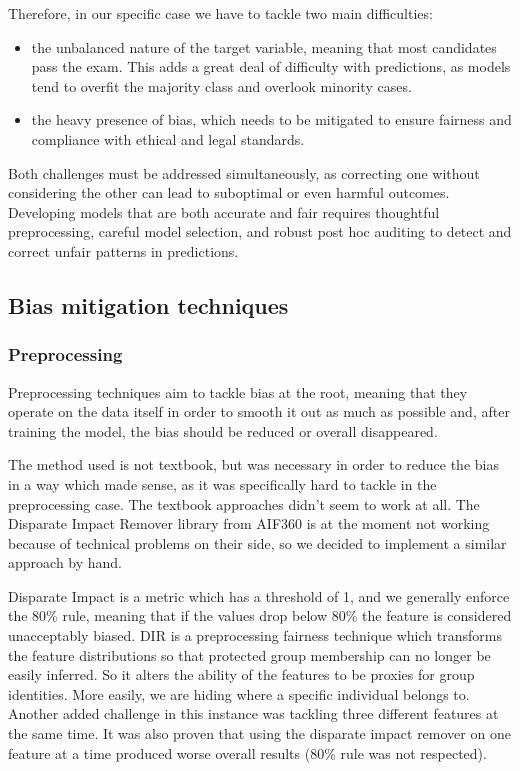 \documentclass{article}
\begin{document}
Therefore, in our specific case we have to tackle two main difficulties: 
\begin{itemize}
    \item the unbalanced nature of the target variable, meaning that most candidates pass the exam. This adds a great deal of difficulty with predictions, as models tend to overfit the majority class and overlook minority cases.
    \item the heavy presence of bias, which needs to be mitigated to ensure fairness and compliance with ethical and legal standards.
\end{itemize}
Both challenges must be addressed simultaneously, as correcting one without considering the other can lead to suboptimal or even harmful outcomes. Developing models that are both accurate and fair requires thoughtful preprocessing, careful model selection, and robust post hoc auditing to detect and correct unfair patterns in predictions.


\subsection{Bias mitigation techniques}
\subsubsection{Preprocessing}
Preprocessing techniques aim to tackle bias at the root, meaning that they operate on the data itself in order to smooth it out as much as possible and, after training the model, the bias should be reduced or overall disappeared. 

The method used is not textbook, but was necessary in order to reduce the bias in a way which made sense, as it was specifically hard to tackle in the preprocessing case. The textbook approaches didn't seem to work at all. The Disparate Impact Remover library from AIF360 is at the moment not working because of technical problems on their side, so we decided to implement a similar approach by hand. 

Disparate Impact is a metric which has a threshold of 1, and we generally enforce the 80\% rule, meaning that if the values drop below 80\% the feature is considered unacceptably biased. DIR is a preprocessing fairness technique which transforms the feature distributions so that protected group membership can no longer be easily inferred. So it alters the ability of the features to be proxies for group identities. More easily, we are hiding where a specific individual belongs to. Another added challenge in this instance was tackling three different features at the same time. It was also proven that using the disparate impact remover on one feature at a time produced worse overall results (80\% rule was not respected).
\end{document}
